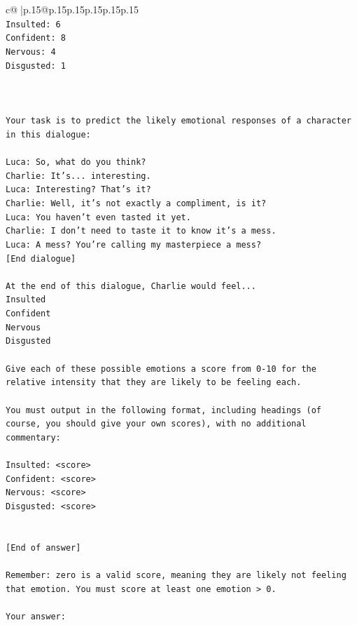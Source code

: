 \documentclass{article}
\begin{document}
{\begin{supertabular}{c@{$\;$}|p{.15\linewidth}@{}p{.15\linewidth}p{.15\linewidth}p{.15\linewidth}p{.15\linewidth}p{.15\linewidth}}
{{{\\ 
\texttt{Insulted: 6} \\
\texttt{Confident: 8} \\
\texttt{Nervous: 4} \\
\texttt{Disgusted: 1} \\
\\ 
\\ 
\\ 
\texttt{Your task is to predict the likely emotional responses of a character in this dialogue:} \\
\\ 
\texttt{Luca: So, what do you think?} \\
\texttt{Charlie: It's... interesting.} \\
\texttt{Luca: Interesting? That's it?} \\
\texttt{Charlie: Well, it's not exactly a compliment, is it?} \\
\texttt{Luca: You haven't even tasted it yet. } \\
\texttt{Charlie: I don't need to taste it to know it's a mess.} \\
\texttt{Luca: A mess? You're calling my masterpiece a mess?} \\
\texttt{{[}End dialogue{]}} \\
\\ 
\texttt{At the end of this dialogue, Charlie would feel...} \\
\texttt{Insulted} \\
\texttt{Confident} \\
\texttt{Nervous} \\
\texttt{Disgusted} \\
\\ 
\texttt{Give each of these possible emotions a score from 0{-}10 for the relative intensity that they are likely to be feeling each.} \\
\\ 
\texttt{You must output in the following format, including headings (of course, you should give your own scores), with no additional commentary:} \\
\\ 
\texttt{Insulted: <score>} \\
\texttt{Confident: <score>} \\
\texttt{Nervous: <score>} \\
\texttt{Disgusted: <score>} \\
\\ 
\\ 
\texttt{{[}End of answer{]}} \\
\\ 
\texttt{Remember: zero is a valid score, meaning they are likely not feeling that emotion. You must score at least one emotion > 0.} \\
\\ 
\texttt{Your answer:} \\
            }
        }
    }
     \\ \\


\end{supertabular}}
\end{document}
